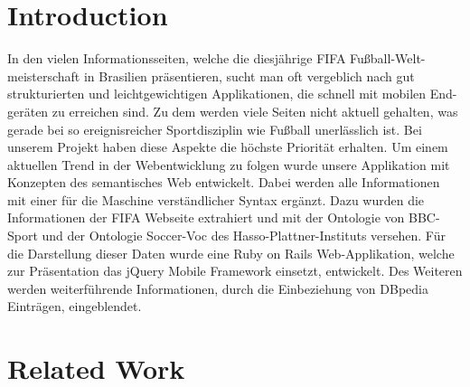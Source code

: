 \documentclass[runningheads,a4paper]{llncs}
\begin{document}
\section{Introduction}

In den vielen Informationsseiten, welche die diesjährige FIFA Fußball-Welt-meisterschaft in Brasilien präsentieren, sucht man oft vergeblich nach gut strukturierten und leichtgewichtigen Applikationen, die schnell mit mobilen End-geräten zu erreichen sind. Zu dem werden viele Seiten nicht aktuell gehalten, was gerade bei so ereignisreicher Sportdisziplin wie Fußball unerlässlich ist. Bei unserem Projekt haben diese Aspekte die höchste Priorität erhalten. Um einem aktuellen Trend in der Webentwicklung zu folgen wurde unsere Applikation mit Konzepten des semantisches Web entwickelt. Dabei werden alle Informationen mit einer für die Maschine verständlicher Syntax ergänzt. Dazu wurden die Informationen der FIFA Webseite extrahiert und mit der Ontologie von BBC-Sport und der Ontologie Soccer-Voc des Hasso-Plattner-Instituts versehen. Für die Darstellung dieser Daten wurde eine Ruby on Rails Web-Applikation, welche zur Präsentation das jQuery Mobile Framework einsetzt, entwickelt. Des Weiteren werden weiterführende Informationen, durch die Einbeziehung von DBpedia Einträgen, eingeblendet.    


\section{Related Work}
\end{document}
